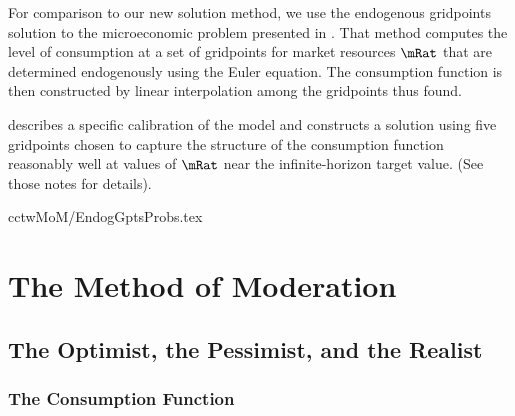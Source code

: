 \documentclass[titlepage,abstract]{\econtex}
\begin{document}
For comparison to our new solution method, we use the endogenous
gridpoints solution to the microeconomic problem presented in
\cite{carrollEGM}.  That method computes the level of
consumption at a set of gridpoints for market resources $\mRat$ that
are determined endogenously using the Euler equation.  The consumption
function is then constructed by linear interpolation among the
gridpoints thus found.

\cite{SolvingMicroDSOPs} describes a specific calibration of the model and
constructs a solution using five gridpoints chosen to 
capture the structure of the consumption function reasonably well at values of
$\mRat$ near the infinite-horizon target value.  (See those notes for details).  

{cctwMoM/EndogGptsProbs.tex}

\hypertarget{The-Method-Of-Moderation}{}
\section{The Method of Moderation}

\hypertarget{The-Optimist-The-Pessimist-and-the-Realist}{}
\subsection{The Optimist, the Pessimist, and the Realist}

\hypertarget{The-Consumption-Function}{}
\subsubsection{The Consumption Function}

\end{document}
